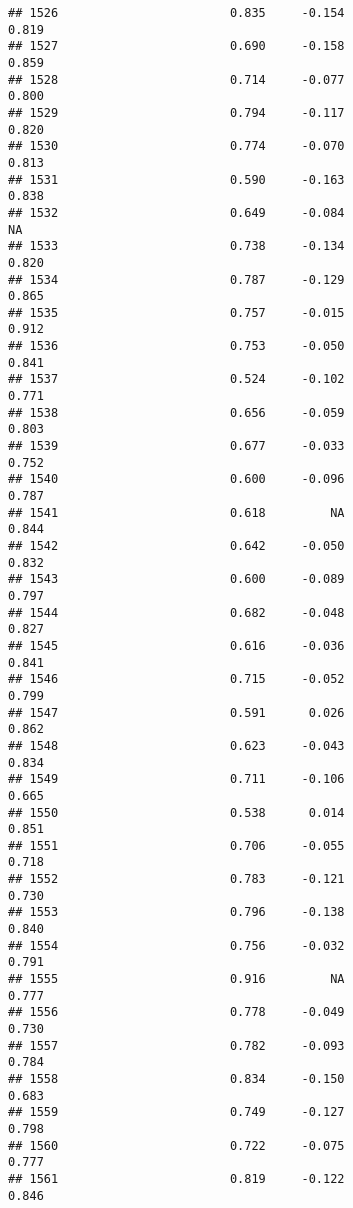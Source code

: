 \documentclass[
]{article}
\begin{document}
\begin{verbatim}
## 1526                        0.835     -0.154                     0.819
## 1527                        0.690     -0.158                     0.859
## 1528                        0.714     -0.077                     0.800
## 1529                        0.794     -0.117                     0.820
## 1530                        0.774     -0.070                     0.813
## 1531                        0.590     -0.163                     0.838
## 1532                        0.649     -0.084                        NA
## 1533                        0.738     -0.134                     0.820
## 1534                        0.787     -0.129                     0.865
## 1535                        0.757     -0.015                     0.912
## 1536                        0.753     -0.050                     0.841
## 1537                        0.524     -0.102                     0.771
## 1538                        0.656     -0.059                     0.803
## 1539                        0.677     -0.033                     0.752
## 1540                        0.600     -0.096                     0.787
## 1541                        0.618         NA                     0.844
## 1542                        0.642     -0.050                     0.832
## 1543                        0.600     -0.089                     0.797
## 1544                        0.682     -0.048                     0.827
## 1545                        0.616     -0.036                     0.841
## 1546                        0.715     -0.052                     0.799
## 1547                        0.591      0.026                     0.862
## 1548                        0.623     -0.043                     0.834
## 1549                        0.711     -0.106                     0.665
## 1550                        0.538      0.014                     0.851
## 1551                        0.706     -0.055                     0.718
## 1552                        0.783     -0.121                     0.730
## 1553                        0.796     -0.138                     0.840
## 1554                        0.756     -0.032                     0.791
## 1555                        0.916         NA                     0.777
## 1556                        0.778     -0.049                     0.730
## 1557                        0.782     -0.093                     0.784
## 1558                        0.834     -0.150                     0.683
## 1559                        0.749     -0.127                     0.798
## 1560                        0.722     -0.075                     0.777
## 1561                        0.819     -0.122                     0.846

\end{verbatim}
\end{document}
